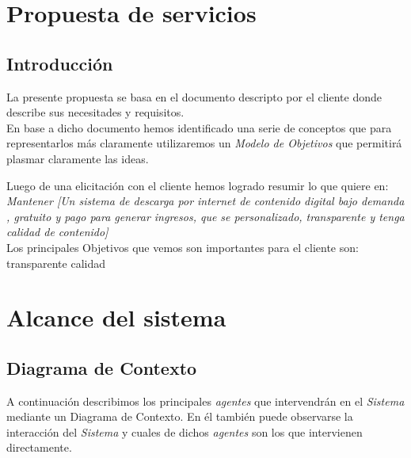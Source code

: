 \documentclass[11pt, a4paper, spanish]{article}
\newenvironment{borde}[1]
{\begin{lrbox}{\fmbox}\begin{minipage}{#1}}
{\end{minipage}\end{lrbox}\fbox{\usebox{\fmbox}}\\[10pt]}
\begin{document}
	



\section{Propuesta de servicios}
\label{sec:Propuesta de servicios}

\subsection{Introducci\'on}

	La presente propuesta se basa en el documento descripto por el cliente donde describe sus necesitades y requisitos.\\

	En base a dicho documento hemos identificado una serie de conceptos que para representarlos m\'as claramente utilizaremos un \emph{Modelo de Objetivos} que permitir\'a plasmar claramente las ideas.

	Luego de una elicitaci\'on con el cliente hemos logrado resumir lo que quiere en: \\

	\emph{Mantener [Un sistema de descarga por internet de contenido digital bajo demanda , gratuito y pago para generar ingresos, que se personalizado, transparente y tenga calidad de contenido]}
	\\
	Los principales Objetivos que vemos son importantes para el cliente son:\\
	transparente
	calidad

\newpage
	
\section{Alcance del sistema}

\subsection{Diagrama de Contexto}

	A continuaci\'on describimos los principales \emph{agentes} que intervendr\'an en el \emph{Sistema} mediante un Diagrama de Contexto.
	En \'el tambi\'en puede observarse la interacci\'on del \emph{Sistema} y cuales de dichos \emph{agentes} son los que intervienen directamente.
\end{document}
